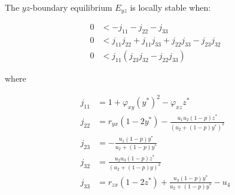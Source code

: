 \begin{theorem}\label{thm:eq-boundary-yz-stability}
    The $yz$-boundary equilibrium $E_{yz}$ is locally stable when:

    \begin{align*}
        0 &< -j_{11}-j_{22}-j_{33}\\
        0 &< j_{11}j_{22}+j_{11}j_{33}+j_{22}j_{33}-j_{23}j_{32}\\
        0 &< j_{11}\left(j_{23}j_{32}-j_{22}j_{33}\right)
    \end{align*}

    where
    
    \begin{align*}
        j_{11} &= 1+\varphi_{xy}\left(y^*\right)^2-\varphi_{xz}z^*\\
        j_{22} &= r_{yx}\left(1-2y^*\right)-\frac{u_1u_2\left(1-p\right)z^*}{\left(u_2+\left(1-p\right)y^*\right)^2}\\
        j_{23} &= -\frac{u_1\left(1-p\right)y^*}{u_2+\left(1-p\right)y^*}\\
        j_{32} &= \frac{u_2u_3\left(1-p\right)z^*}{\left(u_2+\left(1-p\right)y\right)^2}\\
        j_{33} &= r_{zx}\left(1-2z^*\right)+\frac{u_3\left(1-p\right)y^*}{u_2+\left(1-p\right)y^*}-u_4
    \end{align*}
\end{theorem}

